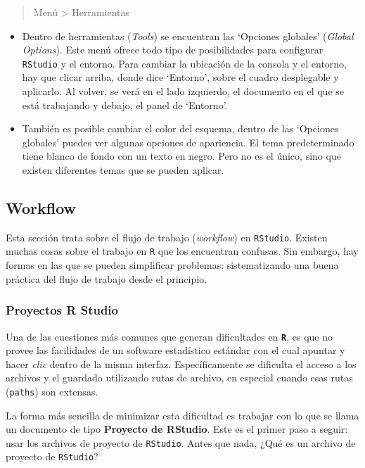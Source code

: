 \documentclass[
]{article}
\begin{document}
\begin{quote}
Menú \textgreater{} Herramientas
\end{quote}

\begin{itemize}
\item
  Dentro de herramientas (\emph{Tools}) se encuentran las `Opciones globales' (\emph{Global Options}). Este menú ofrece todo tipo de posibilidades para configurar \texttt{RStudio} y el entorno. Para cambiar la ubicación de la consola y el entorno, hay que clicar arriba, donde dice `Entorno', sobre el cuadro desplegable y aplicarlo. Al volver, se verá en el lado izquierdo, el documento en el que se está trabajando y debajo, el panel de `Entorno'.
\item
  También es posible cambiar el color del esquema, dentro de las `Opciones globales' puedes ver algunas opciones de apariencia. El tema predeterminado tiene blanco de fondo con un texto en negro. Pero no es el único, sino que existen diferentes temas que se pueden aplicar.
\end{itemize}

\hypertarget{workflow}{%
\subsection{Workflow}\label{workflow}}

Esta sección trata sobre el flujo de trabajo (\emph{workflow}) en \texttt{RStudio}. Existen muchas cosas sobre el trabajo en \texttt{R} que los encuentran confusas. Sin embargo, hay formas en las que se pueden simplificar problemas: sistematizando una buena práctica del flujo de trabajo desde el principio.

\hypertarget{proyectos-r-studio}{%
\subsubsection{Proyectos R Studio}\label{proyectos-r-studio}}

Una de las cuestiones más comunes que generan dificultades en \textbf{\texttt{R}}, es que no provee las facilidades de un software estadístico estándar con el cual apuntar y hacer \emph{clic} dentro de la misma interfaz. Específicamente se dificulta el acceso a los archivos y el guardado utilizando rutas de archivo, en especial cuando esas rutas (\texttt{paths}) son extensas.

La forma más sencilla de minimizar esta dificultad es trabajar con lo que se llama un documento de tipo \textbf{Proyecto de RStudio}. Este es el primer paso a seguir: usar los archivos de proyecto de \texttt{RStudio}. Antes que nada, ¿Qué es un archivo de proyecto de \texttt{RStudio}?
\end{document}
